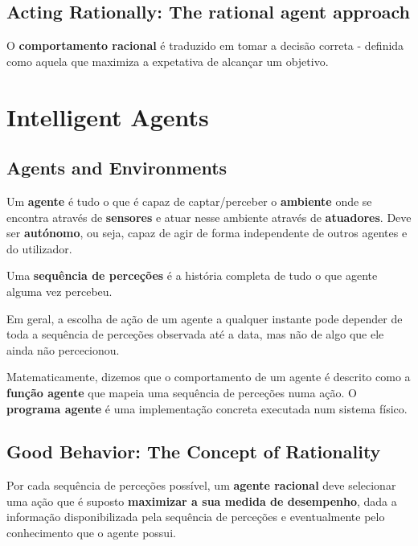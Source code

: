 \documentclass[11pt]{article}
\begin{document}
\subsection{Acting Rationally: The rational agent approach}

O \textbf{comportamento racional} é traduzido em tomar a decisão correta - definida como aquela que maximiza a expetativa de alcançar um objetivo.

\newpage
\section{Intelligent Agents}

\subsection{Agents and Environments}

Um \textbf{agente} é tudo o que é capaz de captar/perceber o \textbf{ambiente} onde se encontra através de \textbf{sensores} e atuar nesse ambiente através de \textbf{atuadores}. Deve ser \textbf{autónomo}, ou seja, capaz de agir de forma independente de outros agentes e do utilizador.\vspace{10pt}

Uma \textbf{sequência de perceções} é a história completa de tudo o que agente alguma vez percebeu.\vspace{10pt}

Em geral, a escolha de ação de um agente a qualquer instante pode depender de toda a sequência de perceções observada até a data, mas não de algo que ele ainda não percecionou.\vspace{10pt}

Matematicamente, dizemos que o comportamento de um agente é descrito como a \textbf{função agente} que mapeia uma sequência de perceções numa ação. O \textbf{programa agente} é uma implementação concreta executada num sistema físico.

\subsection{Good Behavior: The Concept of Rationality}

Por cada sequência de perceções possível, um \textbf{agente racional} deve selecionar uma ação que é suposto \textbf{maximizar a sua medida de desempenho}, dada a informação disponibilizada pela sequência de perceções e eventualmente pelo conhecimento que o agente possui.\vspace{10pt}
\end{document}
